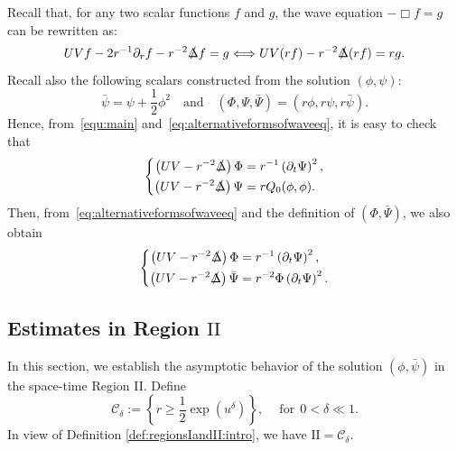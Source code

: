 \documentclass[a4paper,reqno]{amsart}
\theoremstyle{definition}
\numberwithin{equation}{section}
\def \pt{\partial_{t}}
\def\Deltas{\slashed{\Delta}}
\def\lab{\label}
\begin{document}
Recall that, for any two scalar functions $f$ and $g$, the wave equation $-\Box f=g$ can be rewritten as:
\begin{equation}\label{eq:alternativeformsofwaveeq}
UV f-2r^{-1}\partial_{r}f-r^{-2}\Deltas f=g\Longleftrightarrow UV(rf)-r^{-2}\Deltas (rf)=rg.
\end{equation}
Recall also the following scalars constructed from the solution $(\phi,\psi)$:
\begin{equation*}
\bar{\psi}=\psi+\frac{1}{2}\phi^2 \quad \mbox{and}\quad 
(\Phi,\Psi,\bar{\Psi})=(r\phi,r\psi,r\bar{\psi}).
\end{equation*}
Hence, from~\eqref{equ:main} and~\eqref{eq:alternativeformsofwaveeq}, it is easy to check that 
 \begin{equation}\label{equ:PhiPsi:waveUV}
\left\{
\begin{aligned}
    \left(UV-r^{-2}\Deltas\right)\Phi&=r^{-1}\left(\pt \Psi\right)^{2},\\
    \left(UV-r^{-2}\Deltas\right)\Psi&=rQ_0(\phi,\phi).
    \end{aligned}
\right.
 \end{equation}
Then, from~\eqref{eq:alternativeformsofwaveeq} and the definition of $(\Phi,\bar{\Psi})$, we also obtain
 \begin{equation}\label{equ:PhiTPsi1}
\left\{
\begin{aligned}
    \left(UV-r^{-2}\Deltas\right)\Phi&=r^{-1}\left(\pt \Psi\right)^{2},\\
    \left(UV-r^{-2}\Deltas\right)\bar{\Psi}&=r^{-2}\Phi\left(\pt \Psi\right)^{2}.  
    \end{aligned}
\right.
 \end{equation}

\subsection{Estimates in Region $\mathrm{II}$}
\lab{subsect:precise:regionII}



In this section, we establish the asymptotic behavior of the solution $(\phi, \bar{\psi})$ in the space-time Region II. Define 
\begin{equation}
\mathcal{C}_{\delta}:=\left\{r\ge \frac{1}{2}\exp(u^{\delta})\right\},\quad \ \mbox{for}\ \ 0<\delta\ll 1.
\end{equation}
In view of Definition \ref{def:regionsIandII:intro}, we have ${\textrm{II}}=\mathcal{C}_{\delta}$.
\end{document}

